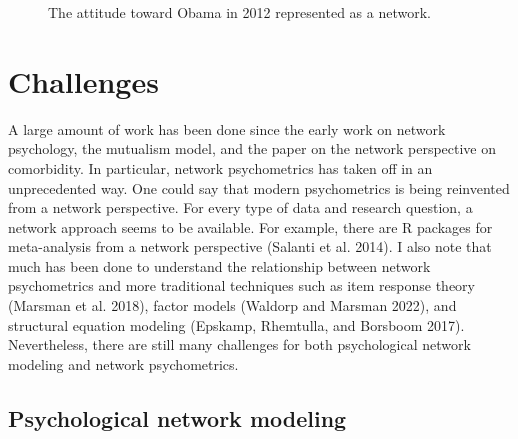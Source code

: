 \documentclass[
  a4paper,
  DIV=11,
  numbers=noendperiod,
  oneside]{scrreprt}
\begin{document}
\begin{figure}


\caption{\label{fig-ch6-img19-old-88}The attitude toward Obama in 2012
represented as a network.}

\end{figure}%

\section{Challenges}\label{sec-Challenges}

A large amount of work has been done since the early work on network
psychology, the mutualism model, and the paper on the network
perspective on comorbidity. In particular, network psychometrics has
taken off in an unprecedented way. One could say that modern
psychometrics is being reinvented from a network perspective. For every
type of data and research question, a network approach seems to be
available. For example, there are R packages for meta-analysis from a
network perspective (Salanti et al. 2014). I also note that much has
been done to understand the relationship between network psychometrics
and more traditional techniques such as item response theory (Marsman et
al. 2018), factor models (Waldorp and Marsman 2022), and structural
equation modeling (Epskamp, Rhemtulla, and Borsboom 2017). Nevertheless,
there are still many challenges for both psychological network modeling
and network psychometrics.

\subsection{Psychological network
modeling}\label{sec-Psychological-network-modelling}
\end{document}

